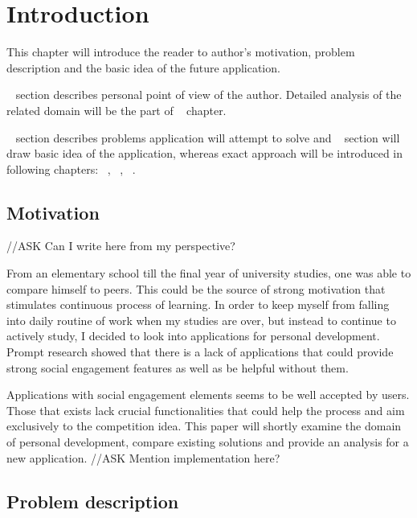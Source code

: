 
\chapter{Introduction}\label{ch:introduction}


This chapter will introduce the reader to author's motivation, problem description and the basic idea of the future application.

~ section describes personal point of view of the author.
Detailed analysis of the related domain will be the part of ~ chapter.

~ section describes problems application will attempt to solve and
~ section will draw basic idea of the application, whereas exact approach
will be introduced in following chapters: ~, ~, ~.


\section{Motivation}\label{sec:introduction-motivation}

{\color{gray}//ASK Can I write here from my perspective?}

From an elementary school till the final year of university studies, one was able to compare himself to peers.
This could be the source of strong motivation that stimulates continuous process of learning.
In order to keep myself from falling into daily routine of work when my studies are over,
but instead to continue to actively study, I decided to look into applications for personal development.
Prompt research showed that there is a lack of applications that could provide strong social engagement features
as well as be helpful without them.

Applications with social engagement elements seems to be well accepted by users.
Those that exists lack crucial functionalities that could help the process and aim exclusively to the competition idea.
This paper will shortly examine the domain of personal development, compare existing solutions and provide an analysis for a
new application.
{\color{gray}//ASK Mention implementation here?}

\section{Problem description}\label{sec:problem-description}


